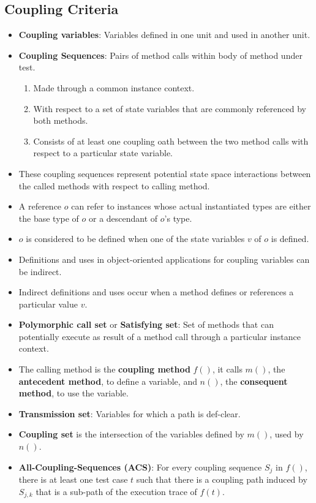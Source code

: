 \documentclass[a4paper]{article}
\begin{document}
\subsection{Coupling Criteria}
\begin{itemize}
    \item \textbf{Coupling variables}: Variables defined in one unit and used in another unit.
    \item \textbf{Coupling Sequences}: Pairs of method calls within body of method under test.
    \begin{enumerate}
        \item Made through a common instance context.
        \item With respect to a set of state variables that are commonly referenced by both methods.
        \item Consists of at least one coupling oath between the two method calls with respect to a particular state variable.
    \end{enumerate}
    \item These coupling sequences represent potential state space interactions between the called methods with respect to calling method.
    \item A reference $o$ can refer to instances whose actual instantiated types are either the base type of $o$ or a descendant of $o$'s type.
    \item $o$ is considered to be defined when one of the state variables $v$ of $o$ is defined.
    \item Definitions and uses in object-oriented applications for coupling variables can be indirect.
    \item Indirect definitions and uses occur when a method defines or references a particular value $v$.
    \item \textbf{Polymorphic call set} or \textbf{Satisfying set}: Set of methods that can potentially execute as result of a method call through a particular instance context.
    \item The calling method is the \textbf{coupling method} $f()$, it calls $m()$, the \textbf{antecedent method}, to define a variable, and $n()$, the \textbf{consequent method}, to use the variable.
    \item \textbf{Transmission set}: Variables for which a path is def-clear.
    \item \textbf{Coupling set} is the intersection of the variables defined by $m()$, used by $n()$.
    \item \textbf{All-Coupling-Sequences (ACS)}: For every coupling sequence $S_j$ in $f()$, there is at least one test case $t$ such that there is a coupling path induced by $S_{j,k}$ that is a sub-path of the execution trace of $f(t)$.

\end{itemize}
\end{document}
